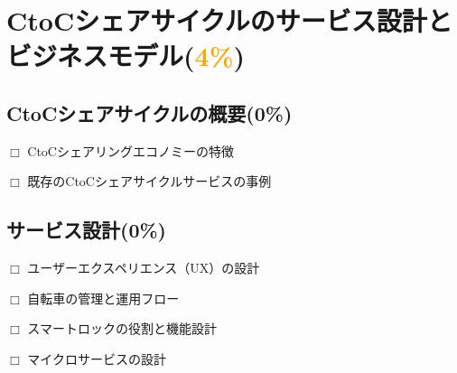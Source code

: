 \section{CtoCシェアサイクルのサービス設計とビジネスモデル(\textcolor{orange}{4\%})}
  \label{sec:CtoCシェアサイクルのサービス設計とビジネスモデル}
  
  \subsection{CtoCシェアサイクルの概要(0\%)}
    \label{sec:CtoCシェアサイクルの概要}
      \par $\Box$ CtoCシェアリングエコノミーの特徴
      \par $\Box$ 既存のCtoCシェアサイクルサービスの事例
      
  \subsection{サービス設計(0\%)}
    \label{sec:サービス設計}
      \par $\Box$ ユーザーエクスペリエンス（UX）の設計
      \par $\Box$ 自転車の管理と運用フロー
      \par $\Box$ スマートロックの役割と機能設計
      \par $\Box$ マイクロサービスの設計

